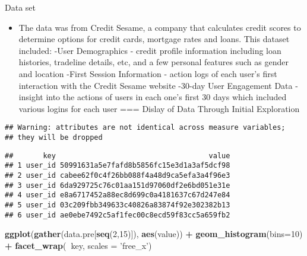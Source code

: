 \documentclass[ignorenonframetext,]{beamer}
\newenvironment{Shaded}{\begin{snugshade}}{\end{snugshade}}
\newcommand{\KeywordTok}[1]{\textcolor[rgb]{0.13,0.29,0.53}{\textbf{#1}}}
\newcommand{\DataTypeTok}[1]{\textcolor[rgb]{0.13,0.29,0.53}{#1}}
\newcommand{\DecValTok}[1]{\textcolor[rgb]{0.00,0.00,0.81}{#1}}
\newcommand{\StringTok}[1]{\textcolor[rgb]{0.31,0.60,0.02}{#1}}
\newcommand{\CommentTok}[1]{\textcolor[rgb]{0.56,0.35,0.01}{\textit{#1}}}
\newcommand{\OperatorTok}[1]{\textcolor[rgb]{0.81,0.36,0.00}{\textbf{#1}}}
\newcommand{\NormalTok}[1]{#1}
\providecommand{\tightlist}{%
  \setlength{\itemsep}{0pt}\setlength{\parskip}{0pt}}
\begin{document}
\begin{frame}[fragile]{Data set}

\begin{itemize}
\tightlist
\item
  The data was from Credit Sesame, a company that calculates credit
  scores to determine options for credit cards, mortgage rates and
  loans. This dataset included: -User Demographics - credit profile
  information including loan histories, tradeline details, etc, and a
  few personal features such as gender and location -First Session
  Information - action logs of each user's first interaction with the
  Credit Sesame website -30-day User Engagement Data - insight into the
  actions of users in each one's first 30 days which included various
  logins for each user === Dislay of Data Through Initial Exploration
\end{itemize}

\begin{Shaded}
\end{Shaded}

\begin{verbatim}
## Warning: attributes are not identical across measure variables;
## they will be dropped
\end{verbatim}

\begin{verbatim}
##       key                                    value
## 1 user_id 50991631a5e7fafd8b5856fc15e3d1a3af5dcf98
## 2 user_id cabee62f0c4f26bb088f4a48d9ca5efa3a4f96e3
## 3 user_id 6da929725c76c01aa151d97060df2e6bd051e31e
## 4 user_id e8a6717452a88ec8d699c0a4181637c67d247e84
## 5 user_id 03c209fbb349633c40826a83874f92e302382b13
## 6 user_id ae0ebe7492c5af1fec00c8ecd59f83cc5a659fb2
\end{verbatim}

\begin{Shaded}
\begin{Highlighting}[]
\KeywordTok{ggplot}\NormalTok{(}\KeywordTok{gather}\NormalTok{(data.pre[}\KeywordTok{seq}\NormalTok{(}\DecValTok{2}\NormalTok{,}\DecValTok{15}\NormalTok{)]), }\KeywordTok{aes}\NormalTok{(value)) }\OperatorTok{+}\StringTok{ }
\StringTok{    }\KeywordTok{geom_histogram}\NormalTok{(}\DataTypeTok{bins=}\DecValTok{10}\NormalTok{) }\OperatorTok{+}\StringTok{ }
\StringTok{    }\KeywordTok{facet_wrap}\NormalTok{(}\OperatorTok{~}\NormalTok{key, }\DataTypeTok{scales =} \StringTok{'free_x'}\NormalTok{)}
\end{Highlighting}
\end{Shaded}


\end{frame}
\end{document}
